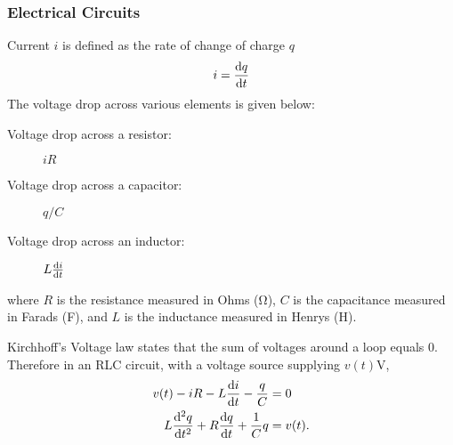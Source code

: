 \documentclass{article}
\begin{document}
\subsubsection{Electrical Circuits}
Current $i$ is defined as the rate of change of charge $q$
\begin{equation*}
    i = \dv{q}{t}
\end{equation*}
The voltage drop across various elements is given below:
\begin{description}
    \item[Voltage drop across a resistor:] $iR$
    \item[Voltage drop across a capacitor:] $q/C$
    \item[Voltage drop across an inductor:] $L \dv{i}{t}$
\end{description}
where $R$ is the resistance measured in Ohms (\si{\ohm}), 
$C$ is the capacitance measured in Farads (\si{\farad}), 
and $L$ is the inductance measured in Henrys (\si{\henry}).

Kirchhoff's Voltage law states that the sum of voltages around a loop equals 0. 
Therefore in an RLC circuit, with a voltage source supplying $v(t)\si{\volt}$,
\begin{align*}
    v(t) - iR - L \dv{i}{t} - \frac{q}{C} & = 0 \\
    L \dv[2]{q}{t} + R\dv{q}{t} + \frac{1}{C}q & = v(t).
\end{align*}
\end{document}
